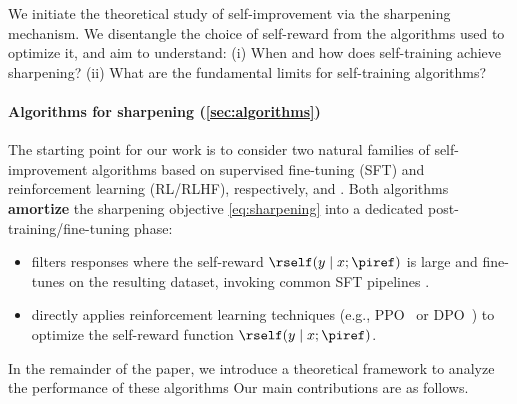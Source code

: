 We initiate the theoretical study of self-improvement via the
sharpening mechanism. We disentangle the choice of self-reward from the algorithms used to optimize it, and aim to
understand: (i) When and how does self-training
achieve sharpening? (ii) What are the fundamental
limits for self-training algorithms?\loose
{}

\paragraph{Algorithms for sharpening (\cref{sec:algorithms})}
The starting point for our work is to consider
two natural families of self-improvement algorithms based on
supervised fine-tuning (SFT) and reinforcement learning (RL/RLHF),
respectively, \bestofnalg and \rlhfalg. Both algorithms \textbf{amortize} the
sharpening objective \eqref{eq:sharpening} into a dedicated
post-training/fine-tuning phase:
\begin{itemize}
\item \bestofnalg filters responses where the self-reward $\rself(y\mid{}x;\piref)$
  is large and fine-tunes on the resulting dataset, invoking common
  SFT pipelines
.\loose
  \item \rlhfalg{} directly applies reinforcement learning techniques (e.g.,
  PPO~\citep{schulman2017proximal} or DPO~\citep{rafailov2024direct}) to optimize the self-reward function $\rself(y\mid{}x;\piref)$.
\end{itemize}
In the remainder of the paper, we introduce a theoretical framework to analyze the performance of these
  algorithms Our main contributions are as follows.



